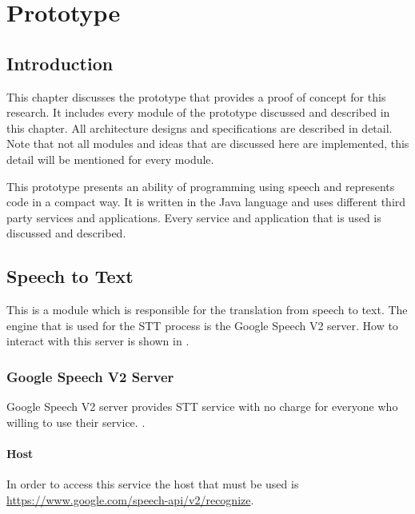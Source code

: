 \chapter{Prototype}
\section{Introduction}
This chapter discusses the prototype that provides a proof of concept for this research. It includes every module of the prototype discussed and described in this chapter. All architecture designs and specifications are described in detail. Note that not all modules and ideas that are discussed here are implemented, this detail will be mentioned for every module.

This prototype presents an ability of programming using speech and represents code in a compact way. It is written in the Java language and uses different third party services and applications. Every service and application that is used is discussed and described.

\section{Speech to Text}
This is a module which is responsible for the translation from speech to text. The engine that is used for the STT process is the Google Speech V2 server. How to interact with this server is shown in \citet{google15}  .
\subsection{Google Speech V2 Server}
Google Speech V2 server provides STT service with no charge for everyone who willing to use their service.
.
\subsubsection{Host}
In order to access this service the host that must be used is \url{https://www.google.com/speech-api/v2/recognize}.
